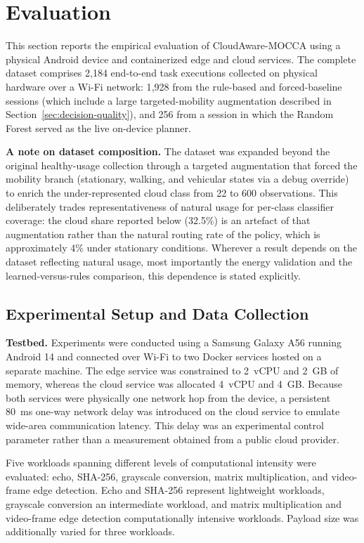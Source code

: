 \section{Evaluation}
\label{sec:evaluation}

This section reports the empirical evaluation of CloudAware-MOCCA using a
physical Android device and containerized edge and cloud services. The complete
dataset comprises 2{,}184 end-to-end task executions collected on physical
hardware over a Wi-Fi network: 1{,}928 from the rule-based and forced-baseline
sessions (which include a large targeted-mobility augmentation described in
Section~\ref{sec:decision-quality}), and 256 from a session in which the Random
Forest served as the live on-device planner.

\textbf{A note on dataset composition.}
The dataset was expanded beyond the original healthy-usage collection through a
targeted augmentation that forced the mobility branch (stationary, walking, and
vehicular states via a debug override) to enrich the under-represented cloud
class from 22 to 600 observations. This deliberately trades representativeness of
natural usage for per-class classifier coverage: the cloud share reported below
(32.5\%) is an artefact of that augmentation rather than the natural routing rate
of the policy, which is approximately 4\% under stationary conditions. Wherever a
result depends on the dataset reflecting natural usage, most importantly the
energy validation and the learned-versus-rules comparison, this dependence is
stated explicitly.


\subsection{Experimental Setup and Data Collection}
\label{sec:eval-setup}

\textbf{Testbed.}
Experiments were conducted using a Samsung Galaxy A56 running Android 14 and
connected over Wi-Fi to two Docker services hosted on a separate machine. The
edge service was constrained to 2~vCPU and 2~GB of memory, whereas the cloud
service was allocated 4~vCPU and 4~GB. Because both services were physically one
network hop from the device, a persistent 80~ms one-way network delay was
introduced on the cloud service to emulate wide-area communication latency. This
delay was an experimental control parameter rather than a measurement obtained
from a public cloud provider.

Five workloads spanning different levels of computational intensity were
evaluated: echo, SHA-256, grayscale conversion, matrix multiplication, and
video-frame edge detection. Echo and SHA-256 represent lightweight workloads,
grayscale conversion an intermediate workload, and matrix multiplication and
video-frame edge detection computationally intensive workloads. Payload size was
additionally varied for three workloads.

